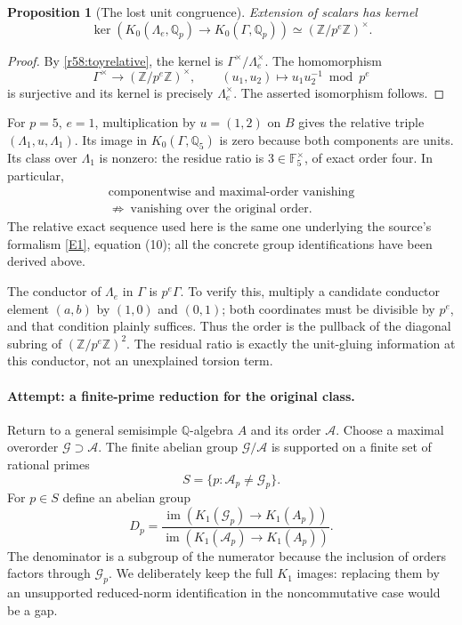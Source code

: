 \documentclass[11pt,a4paper]{article}
\newcommand{\Z}{\mathbb{Z}}
\newcommand{\Q}{\mathbb{Q}}
\newcommand{\F}{\mathbb{F}}
\newcommand{\eref}[2]{\hyperlink{extra:#1:#2}{[E#2]}}
\newtheorem{notebookproposition}[notebooklemma]{Proposition}
\numberwithin{equation}{section}
\begin{document}
\begin{notebookproposition}[The lost unit congruence]\label{r58:kernel}
Extension of scalars has kernel
\[
 \ker\!\left(K_0(\Lambda_e,\Q_p)\longrightarrow
                  K_0(\Gamma,\Q_p)\right)
       \simeq(\Z/p^e\Z)^\times.
\]
\end{notebookproposition}
\begin{proof}
By \eqref{r58:toyrelative}, the kernel is $\Gamma^\times/\Lambda_e^\times$. The homomorphism
\[
 \Gamma^\times\longrightarrow(\Z/p^e\Z)^\times,
 \qquad(u_1,u_2)\longmapsto u_1u_2^{-1}\bmod p^e
\]
is surjective and its kernel is precisely $\Lambda_e^\times$. The asserted isomorphism follows.
\end{proof}

For $p=5$, $e=1$, multiplication by $u=(1,2)$ on $B$ gives the relative triple $(\Lambda_1,u,\Lambda_1)$. Its image in $K_0(\Gamma,\Q_5)$ is zero because both components are units. Its class over $\Lambda_1$ is nonzero: the residue ratio is $3\in\F_5^\times$, of exact order four. In particular,
\begin{equation}\label{r58:falseimplication}
 \begin{gathered}
 \text{componentwise and maximal-order vanishing}\\
 \not\Longrightarrow\ \text{vanishing over the original order}.
 \end{gathered}
\end{equation}
The relative exact sequence used here is the same one underlying the source's formalism \eref{30006700}{1}, equation (10); all the concrete group identifications have been derived above.

The conductor of $\Lambda_e$ in $\Gamma$ is $p^e\Gamma$. To verify this, multiply a candidate conductor element $(a,b)$ by $(1,0)$ and $(0,1)$; both coordinates must be divisible by $p^e$, and that condition plainly suffices. Thus the order is the pullback of the diagonal subring of $(\Z/p^e\Z)^2$. The residual ratio is exactly the unit-gluing information at this conductor, not an unexplained torsion term.

\paragraph{Attempt: a finite-prime reduction for the original class.}
Return to a general semisimple $\Q$-algebra $A$ and its order $\mathcal A$. Choose a maximal overorder $\mathcal G\supset\mathcal A$. The finite abelian group $\mathcal G/\mathcal A$ is supported on a finite set of rational primes
\[
 S=\{p:\mathcal A_p\ne\mathcal G_p\}.
\]
For $p\in S$ define an abelian group
\begin{equation}\label{r58:residual}
 D_p=\frac{\operatorname{im}(K_1(\mathcal G_p)\to K_1(A_p))}
           {\operatorname{im}(K_1(\mathcal A_p)\to K_1(A_p))}.
\end{equation}
The denominator is a subgroup of the numerator because the inclusion of orders factors through $\mathcal G_p$. We deliberately keep the full $K_1$ images: replacing them by an unsupported reduced-norm identification in the noncommutative case would be a gap.
\end{document}
